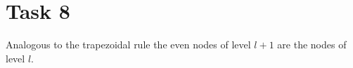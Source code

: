 \documentclass[a4paper,10pt]{article}
\title{}
\author{}
\begin{document}
\section*{Task 8}

Analogous to the trapezoidal rule the even nodes of level $l+1$ are the nodes of level $l$.
\end{document}
